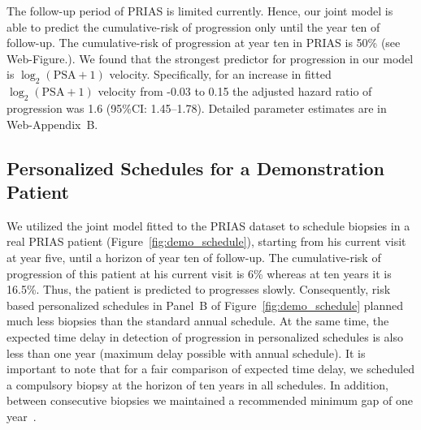 The follow-up period of PRIAS is limited currently. Hence, our joint model is able to predict the cumulative-risk of progression only until the year ten of follow-up. The cumulative-risk of progression at year ten in PRIAS is 50\% (see Web-Figure.). We found that the strongest predictor for progression in our model is $\log_2(\mbox{PSA} + 1)$ velocity. Specifically, for an increase in fitted $\log_2(\mbox{PSA} + 1)$ velocity from -0.03 to 0.15 the adjusted hazard ratio of progression was 1.6 (95\%CI: 1.45--1.78). Detailed parameter estimates are in Web-Appendix~B.

\subsection{Personalized Schedules for a Demonstration Patient}
We utilized the joint model fitted to the PRIAS dataset to schedule biopsies in a real PRIAS patient (Figure~\ref{fig:demo_schedule}), starting from his current visit at year five, until a horizon of year ten of follow-up. The cumulative-risk of progression of this patient at his current visit is 6\% whereas at ten years it is 16.5\%. Thus, the patient is predicted to progresses slowly. Consequently, risk based personalized schedules in Panel~B of Figure~\ref{fig:demo_schedule} planned much less biopsies than the standard annual schedule. At the same time, the expected time delay in detection of progression in personalized schedules is also less than one year (maximum delay possible with annual schedule). It is important to note that for a fair comparison of expected time delay, we scheduled a compulsory biopsy at the horizon of ten years in all schedules. In addition, between consecutive biopsies we maintained a recommended minimum gap of one year~\citep{bokhorst2016decade}.

